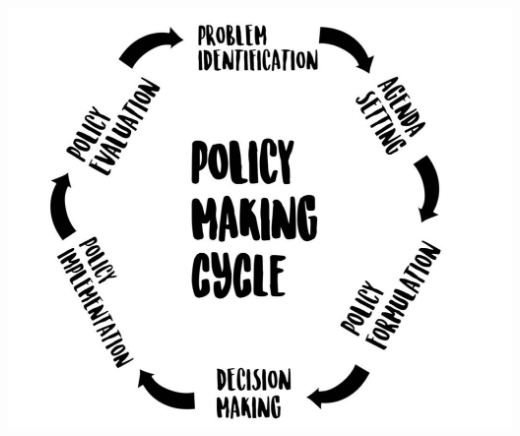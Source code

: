 \documentclass[aspectratio=169]{beamer}
\theoremstyle{principle}
\begin{document}
\begin{frame}
    \begin{center}
     \includegraphics[scale=0.4]{policy_process.png}
     \end{center}
\end{frame}
\end{document}
